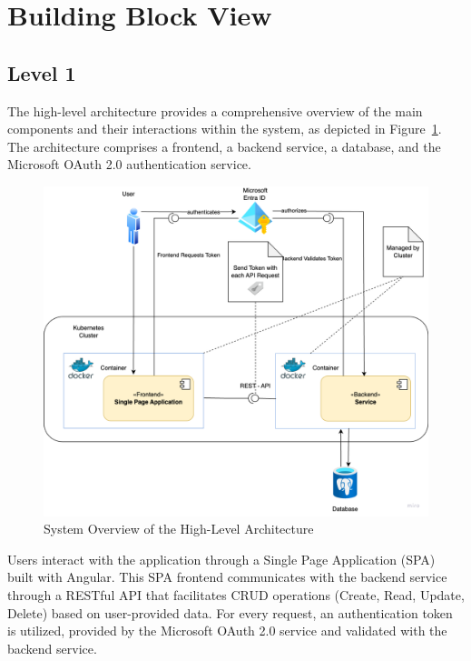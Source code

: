 \section{Building Block View}\label{sec:building-block-view}

\subsection{Level 1}\label{subsec:level-1}

The high-level architecture provides a comprehensive overview of the main components and their interactions within the system, as depicted in Figure~\ref{fig:system_overview}.
The architecture comprises a frontend, a backend service, a database, and the Microsoft OAuth 2.0 authentication service.

\begin{figure}[ht]
    \centering
    \includegraphics[width=\textwidth]{./images/high_level_architecture/system_overview}
    \caption{System Overview of the High-Level Architecture}
    \label{fig:system_overview}
\end{figure}

Users interact with the application through a Single Page Application (SPA) built with Angular.
This SPA frontend communicates with the backend service through a RESTful API that facilitates CRUD operations (Create, Read, Update, Delete) based on user-provided data.
For every request, an authentication token is utilized, provided by the Microsoft OAuth 2.0 service and validated with the backend service.

